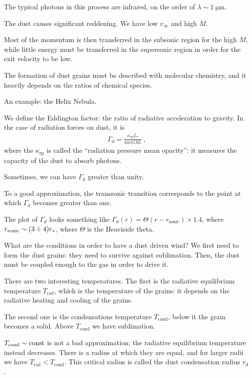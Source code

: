 \documentclass[main.tex]{subfiles}
\begin{document}
The typical photons in this process are infrared, on the order of \(\lambda \sim \SI{1}{\micro\metre}\). 

The dust causes significant reddening. We have low \(v _{ \infty }\) and high \(\dot{M}\).

Most of the momentum is then transferred in the subsonic region for the high \(\dot{M}\), while little energy must be transferred in the supersonic region in order for the exit velocity to be low. 

The formation of dust grains must be described with molecular chemistry, and it heavily depends on the ratios of chemical species. 

An example: the Helix Nebula. 

We define the Eddington factor: the ratio of radiative acceleration to gravity. 
In the case of radiation forces on dust, it is 
%
\begin{align}
  \Gamma_{d} = \frac{\kappa _{\text{rp}}L_{*}}{4 \pi c G M_{*}}
\,,
\end{align}
%
where the \(\kappa _{\text{rp}} \) is called the ``radiation pressure mean opacity'': it measures the capacity of the dust to absorb photons. 

Sometimes, we can have \(\Gamma_{d}\) greater than unity.

To a good approximation, the transsonic transition corresponds to the point at which \(\Gamma_{d}\) becomes greater than one. 

The plot of \(\Gamma_{d}\) looks something like \(\Gamma_{d} (r) = \Theta (r - r _{\text{sonic}}) \times 1.4\), where \(r _{\text{sonic}} \sim (3 \divisionsymbol 4) r_{*}\), where \(\Theta \) is the Heaviside theta.

What are the conditions in order to have a dust driven wind? We first need to  form the dust grains: they need to survive against sublimation. 
Then, the dust must be coupled enough to the gas in order to drive it. 

There are two interesting temperatures. The first is the radiative equilibrium temperature \(T _{\text{rad}}\), which is the temperature of the grains: it depends on the radiative heating and cooling of the grains. 

The second one is the condensations temperature \(T _{\text{cond}}\), below it the grain becomes a solid. 
Above \(T _{\text{cond}}\) we have sublimation. 

\(T _{\text{cond}} \sim \text{const}\) is not a bad approximation; the radiative equilibrium temperature instead decreases. 
There is a radius at which they are equal, and for larger radii we have \(T _{\text{rad}} < T _{\text{cond}}\). 
This critical radius is called the dust condensation radius \(r_{d}\). 
\end{document}
